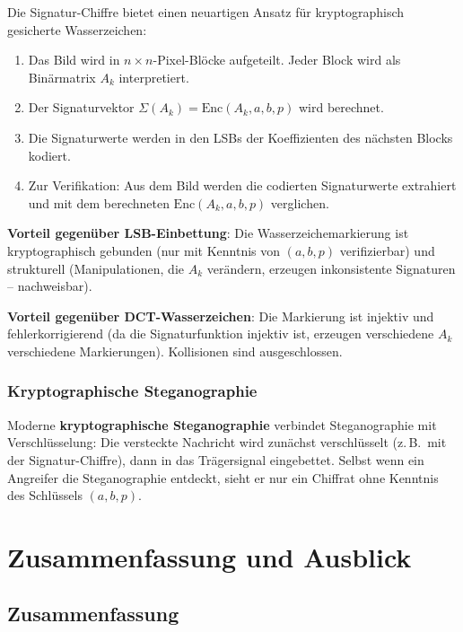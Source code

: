 ﻿\documentclass[a4paper,12pt]{scrreprt}
\theoremstyle{definition}
\begin{document}
Die Signatur-Chiffre bietet einen neuartigen Ansatz für kryptographisch gesicherte Wasserzeichen:

\begin{enumerate}
    \item Das Bild wird in $n\times n$-Pixel-Blöcke aufgeteilt. Jeder Block wird als Binärmatrix $A_k$ interpretiert.
    \item Der Signaturvektor $\Sigma(A_k) = \mathrm{Enc}(A_k, a, b, p)$ wird berechnet.
    \item Die Signaturwerte werden in den LSBs der Koeffizienten des nächsten Blocks kodiert.
    \item Zur Verifikation: Aus dem Bild werden die codierten Signaturwerte extrahiert und mit dem berechneten $\mathrm{Enc}(A_k, a, b, p)$ verglichen.
\end{enumerate}

\textbf{Vorteil gegenüber LSB-Einbettung}: Die Wasserzeichemarkierung ist kryptographisch gebunden (nur mit Kenntnis von $(a,b,p)$ verifizierbar) und strukturell (Manipulationen, die $A_k$ verändern, erzeugen inkonsistente Signaturen -- nachweisbar).

\textbf{Vorteil gegenüber DCT-Wasserzeichen}: Die Markierung ist injektiv und fehlerkorrigierend (da die Signaturfunktion injektiv ist, erzeugen verschiedene $A_k$ verschiedene Markierungen). Kollisionen sind ausgeschlossen.

\subsubsection{Kryptographische Steganographie}

Moderne \textbf{kryptographische Steganographie} \cite{Cox97} verbindet Steganographie mit Verschlüsselung: Die versteckte Nachricht wird zunächst verschlüsselt (z.\,B.\ mit der Signatur-Chiffre), dann in das Trägersignal eingebettet. Selbst wenn ein Angreifer die Steganographie entdeckt, sieht er nur ein Chiffrat ohne Kenntnis des Schlüssels $(a,b,p)$.

\section{Zusammenfassung und Ausblick}
\label{chap:ausblick}

\subsection{Zusammenfassung}
\end{document}
